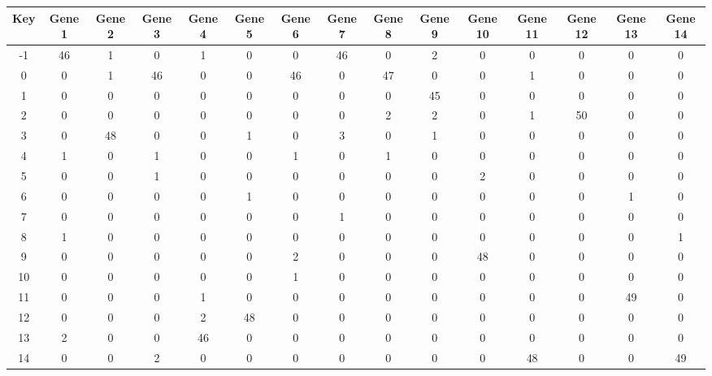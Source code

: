 \begin{tabular}{|c|c|c|c|c|c|c|c|c|c|c|c|c|c|c|}
\hline
Key & Gene 1 & Gene 2 & Gene 3 & Gene 4 & Gene 5 & Gene 6 & Gene 7 & Gene 8 & Gene 9 & Gene 10 & Gene 11 & Gene 12 & Gene 13 & Gene 14 \\
\hline
-1 & 46 & 1 & 0 & 1 & 0 & 0 & 46 & 0 & 2 & 0 & 0 & 0 & 0 & 0 \\
0 & 0 & 1 & 46 & 0 & 0 & 46 & 0 & 47 & 0 & 0 & 1 & 0 & 0 & 0 \\
1 & 0 & 0 & 0 & 0 & 0 & 0 & 0 & 0 & 45 & 0 & 0 & 0 & 0 & 0 \\
2 & 0 & 0 & 0 & 0 & 0 & 0 & 0 & 2 & 2 & 0 & 1 & 50 & 0 & 0 \\
3 & 0 & 48 & 0 & 0 & 1 & 0 & 3 & 0 & 1 & 0 & 0 & 0 & 0 & 0 \\
4 & 1 & 0 & 1 & 0 & 0 & 1 & 0 & 1 & 0 & 0 & 0 & 0 & 0 & 0 \\
5 & 0 & 0 & 1 & 0 & 0 & 0 & 0 & 0 & 0 & 2 & 0 & 0 & 0 & 0 \\
6 & 0 & 0 & 0 & 0 & 1 & 0 & 0 & 0 & 0 & 0 & 0 & 0 & 1 & 0 \\
7 & 0 & 0 & 0 & 0 & 0 & 0 & 1 & 0 & 0 & 0 & 0 & 0 & 0 & 0 \\
8 & 1 & 0 & 0 & 0 & 0 & 0 & 0 & 0 & 0 & 0 & 0 & 0 & 0 & 1 \\
9 & 0 & 0 & 0 & 0 & 0 & 2 & 0 & 0 & 0 & 48 & 0 & 0 & 0 & 0 \\
10 & 0 & 0 & 0 & 0 & 0 & 1 & 0 & 0 & 0 & 0 & 0 & 0 & 0 & 0 \\
11 & 0 & 0 & 0 & 1 & 0 & 0 & 0 & 0 & 0 & 0 & 0 & 0 & 49 & 0 \\
12 & 0 & 0 & 0 & 2 & 48 & 0 & 0 & 0 & 0 & 0 & 0 & 0 & 0 & 0 \\
13 & 2 & 0 & 0 & 46 & 0 & 0 & 0 & 0 & 0 & 0 & 0 & 0 & 0 & 0 \\
14 & 0 & 0 & 2 & 0 & 0 & 0 & 0 & 0 & 0 & 0 & 48 & 0 & 0 & 49 \\
\hline
\end{tabular}